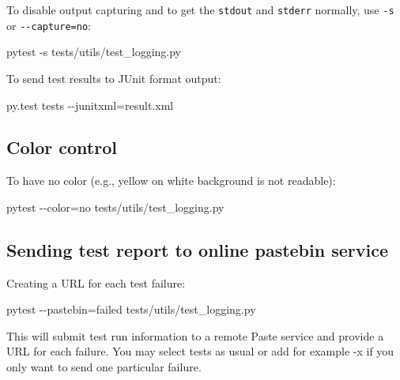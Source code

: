 \documentclass[
]{report}
\newenvironment{Shaded}{\begin{snugshade}}{\end{snugshade}}
\newcommand{\AttributeTok}[1]{\textcolor[rgb]{0.40,0.45,0.13}{#1}}
\newcommand{\ExtensionTok}[1]{\textcolor[rgb]{0.00,0.23,0.31}{#1}}
\newcommand{\NormalTok}[1]{\textcolor[rgb]{0.00,0.23,0.31}{#1}}
\newcommand{\OperatorTok}[1]{\textcolor[rgb]{0.37,0.37,0.37}{#1}}
\begin{document}
To disable output capturing and to get the \texttt{stdout} and
\texttt{stderr} normally, use \texttt{-s} or \texttt{-\/-capture=no}:

\begin{Shaded}
\begin{Highlighting}[]
\ExtensionTok{pytest} \AttributeTok{{-}s}\NormalTok{ tests/utils/test\_logging.py}
\end{Highlighting}
\end{Shaded}

To send test results to JUnit format output:

\begin{Shaded}
\begin{Highlighting}[]
\ExtensionTok{py.test}\NormalTok{ tests }\AttributeTok{{-}{-}junitxml}\OperatorTok{=}\NormalTok{result.xml}
\end{Highlighting}
\end{Shaded}

\subsection{Color control}\label{color-control}

To have no color (e.g., yellow on white background is not readable):

\begin{Shaded}
\begin{Highlighting}[]
\ExtensionTok{pytest} \AttributeTok{{-}{-}color}\OperatorTok{=}\NormalTok{no tests/utils/test\_logging.py}
\end{Highlighting}
\end{Shaded}

\subsection{Sending test report to online pastebin
service}\label{sending-test-report-to-online-pastebin-service}

Creating a URL for each test failure:

\begin{Shaded}
\begin{Highlighting}[]
\ExtensionTok{pytest} \AttributeTok{{-}{-}pastebin}\OperatorTok{=}\NormalTok{failed tests/utils/test\_logging.py}
\end{Highlighting}
\end{Shaded}

This will submit test run information to a remote Paste service and
provide a URL for each failure. You may select tests as usual or add for
example -x if you only want to send one particular failure.
\end{document}
